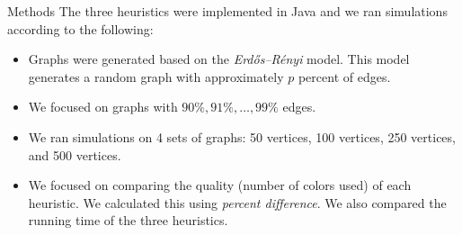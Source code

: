 \documentclass[final]{beamer}
\newlength{\twocolwid}
\newlength{\halfcolwid}
\begin{document}
\begin{frame}[t]
\begin{columns}[t]
\begin{column}{\twocolwid}
\begin{columns}
      \begin{column}{\halfcolwid}
        \vspace{-0.7cm}
        \begin{block}{Methods}
          The three heuristics were implemented in Java and we ran simulations according to the following:
          \begin{itemize}
            \setlength\itemsep{0.4em}
            \item Graphs were generated based on the \emph{Erdős–Rényi} model. This model generates a random graph with approximately $p$ percent of edges.
            \item We focused on graphs with $90\%, 91\%, \ldots, 99\%$ edges.
            \item We ran simulations on 4 sets of graphs: 50 vertices, 100 vertices, 250 vertices, and 500 vertices.
            \item We focused on comparing the quality (number of colors used) of each heuristic. We calculated this using \emph{percent difference}. We also compared the running time of the three heuristics.
          \end{itemize}
        \end{block}
      \end{column}
    \end{columns}


\end{column}
\end{columns}
\end{frame}
\end{document}
